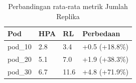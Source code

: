\begin{table}[ht]
  \centering
  \caption{Perbandingan rata-rata metrik Jumlah Replika}\label{tab:deskriptif-replica}
  \begin{tabular}{llll}
    \toprule
    Pod & HPA & RL & Perbedaan \\
    \midrule
    pod\_10 & 2.8 & 3.4 & +0.5 (+18.8\%) \\
    pod\_20 & 5.1 & 7.0 & +1.9 (+38.3\%) \\
    pod\_30 & 6.7 & 11.6 & +4.8 (+71.9\%) \\
    \bottomrule
  \end{tabular}
\end{table}